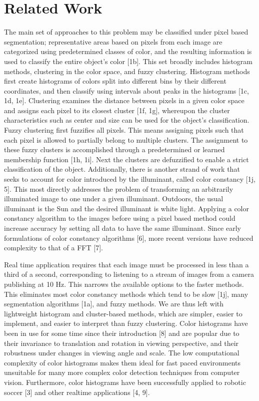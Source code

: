 \documentclass{article} %
\begin{document}

\section{Related Work}

The main set of approaches to this problem may be classified under pixel based segmentation; representative areas based on pixels from each image are categorized using predetermined classes of color, and the resulting information is used to classify the entire object's color [1b]. This set broadly includes histogram methods, clustering in the color space, and fuzzy clustering. Histogram methods first create histograms of colors split into different bins by their different coordinates, and then classify using intervals about peaks in the histograms [1c, 1d, 1e]. Clustering examines the distance between pixels in a given color space and assigns each pixel to its closest cluster [1f, 1g], whereupon the cluster characteristics such as center and size can be used for the object's classification. Fuzzy clustering first fuzzifies all pixels. This means assigning pixels such that each pixel is allowed to partially belong to multiple clusters. The assignment to these fuzzy clusters is accomplished through a predetermined or learned membership function [1h, 1i]. Next the clusters are defuzzified to enable a strict classification of the object. Additionally, there is another strand of work that seeks to account for color introduced by the illuminant, called color constancy [1j, 5]. This most directly addresses the problem of transforming an arbitrarily illuminated image to one under a given illuminant. Outdoors, the usual illuminant is the Sun and the desired illuminant is white light. Applying a color constancy algorithm to the images before using a pixel based method could increase accuracy by setting all data to have the same illuminant. Since early formulations of color constancy algorithms [6], more recent versions have reduced complexity to that of a FFT [7].

Real time application requires that each image must be processed in less than a third of a second, corresponding to listening to a stream of images from a camera publishing at 10 Hz. This narrows the available options to the faster methods. This eliminates most color constancy methods which tend to be slow [1j], many segmentation algorithms [1a], and fuzzy methods. We are thus left with lightweight histogram and cluster-based methods, which are simpler, easier to implement, and easier to interpret than fuzzy clustering. Color histograms have been in use for some time since their introduction [8] and are popular due to their invariance to translation and rotation in viewing perspective, and their robustness under changes in viewing angle and scale. The low computational complexity of color histograms makes them ideal for fast paced environments unsuitable for many more complex color detection techniques from computer vision. Furthermore, color histograms have been successfully applied to robotic soccer [3] and other realtime applications [4, 9].
\end{document}
